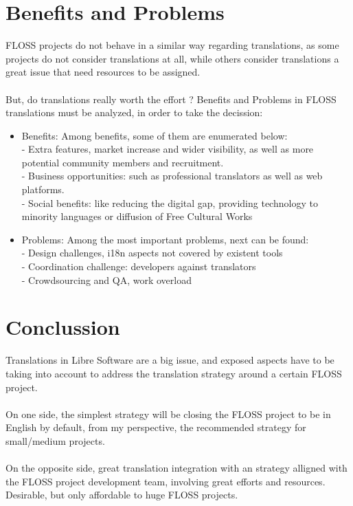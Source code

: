 \documentclass[11pt]{article}
\begin{document}
\section{Benefits and Problems}
FLOSS projects do not behave in a similar way regarding translations, as some projects do not consider translations at all, while others consider translations a great issue that need resources to be assigned.\\
\\
But, do translations really worth the effort ? Benefits and Problems in FLOSS translations must be analyzed, in order to take the decission:
\begin{itemize}
\item{Benefits}: Among benefits, some of them are enumerated below:\\ 
- Extra features, market increase and wider visibility, as well as more potential community members and recruitment.\\
- Business opportunities: such as professional translators as well as web platforms.\\
- Social benefits: like reducing the digital gap, providing technology to minority languages or diffusion of Free Cultural Works
\item{Problems}: Among the most important problems, next can be found:\\
- Design challenges, i18n aspects not covered by existent tools\\
- Coordination challenge: developers against translators\\
- Crowdsourcing and QA, work overload
\end{itemize}
\section{Conclussion}
Translations in Libre Software are a big issue, and exposed aspects have to be taking into account to address the translation strategy around a certain FLOSS project.\\
\\
On one side, the simplest strategy will be closing the FLOSS project to be in English by default, from my perspective, the recommended strategy for small/medium projects.\\
\\
On the opposite side, great translation integration with an strategy alligned with the FLOSS project development team, involving great efforts and resources. Desirable, but only affordable to huge FLOSS projects.\\
\end{document}
